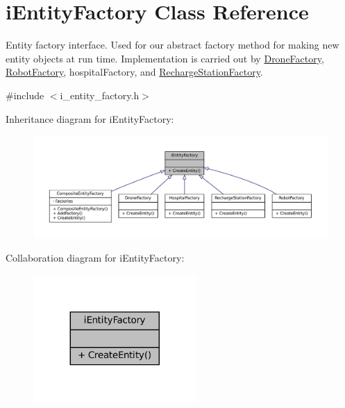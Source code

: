 \hypertarget{classiEntityFactory}{}\section{i\+Entity\+Factory Class Reference}
\label{classiEntityFactory}


Entity factory interface. Used for our abstract factory method for making new entity objects at run time. Implementation is carried out by \hyperlink{classDroneFactory}{Drone\+Factory}, \hyperlink{classRobotFactory}{Robot\+Factory}, hospital\+Factory, and \hyperlink{classRechargeStationFactory}{Recharge\+Station\+Factory}.  




{\ttfamily \#include $<$i\+\_\+entity\+\_\+factory.\+h$>$}



Inheritance diagram for i\+Entity\+Factory\+:\nopagebreak
\begin{figure}[H]
\begin{center}
\leavevmode
\includegraphics[width=350pt]{classiEntityFactory__inherit__graph}
\end{center}
\end{figure}


Collaboration diagram for i\+Entity\+Factory\+:\nopagebreak
\begin{figure}[H]
\begin{center}
\leavevmode
\includegraphics[width=176pt]{classiEntityFactory__coll__graph}
\end{center}
\end{figure}
